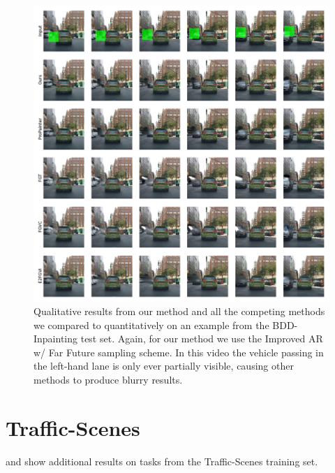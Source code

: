 \begin{figure}[h]
\begin{center}
    \centering
    \captionsetup{type=figure}
    \includegraphics[width=\linewidth]{figures/additional-samples/taxi_all.pdf}
    \caption[Qualitative results from our method and all competing methods on an example from the BDD-Inpainting test set.]{Qualitative results from our method and all the competing methods we compared to quantitatively on an example from the BDD-Inpainting test set. Again, for our method we use the Improved AR w/ Far Future sampling scheme. In this video the vehicle passing in the left-hand lane is only ever partially visible, causing other methods to produce blurry results. }
    \label{fig:taxi}
\end{center}
\end{figure}
\section{Traffic-Scenes}
 and  show additional results on tasks from the Traffic-Scenes training set.

